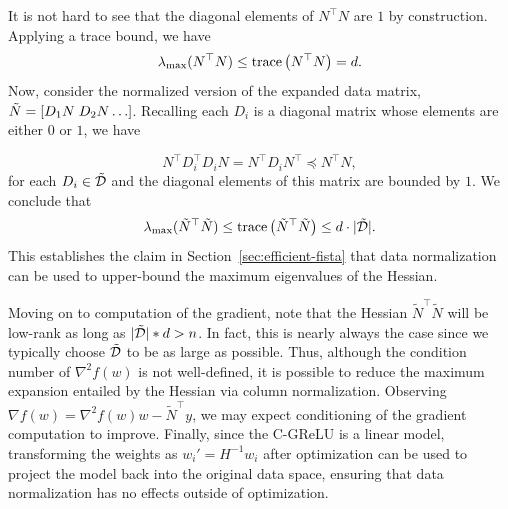 It is not hard to see that the diagonal elements of \( N^\top N \) are \( 1 \) by construction.
Applying a trace bound, we have
\begin{equation}
	\lambda_{\text{max}}(N^\top N) \leq \text{trace}\left(N^\top N\right) = d.
\end{equation}
Now, consider the normalized version of the expanded data matrix, \( \tilde N = \left[D_1 N \; D_2 N \ldots\right] \).
Recalling each \( D_i \) is a diagonal matrix whose elements are either \( 0 \) or \( 1 \), we have

\[ N^\top D_i^\top D_i N = N^\top D_i N^\top \preceq N^\top N, \]
for each \( D_i \in \tilde {\mathcal{D}} \) and the diagonal elements of this matrix are bounded by \( 1 \).
We conclude that
\[
	\lambda_{\text{max}}(\tilde N^\top \tilde N) \leq \text{trace}\left(\tilde N^\top \tilde N\right) \leq d \cdot |\tilde {\mathcal{D}}|.
\]
This establishes the claim in Section~\ref{sec:efficient-fista} that data normalization can be used to upper-bound the maximum eigenvalues of the Hessian.

Moving on to computation of the gradient, note that the Hessian \( \tilde N^\top \tilde N \) will be low-rank as long as \( |\tilde {\mathcal{D}}| * d > n \).
In fact, this is nearly always the case since we typically choose \( \tilde {\mathcal{D}} \) to be as large as possible.
Thus, although the condition number of \( \nabla^2 f(w) \) is not well-defined, it is possible to reduce the maximum expansion entailed by the Hessian via column normalization.
Observing \( \nabla f(w) = \nabla^2 f(w) w - \tilde N^\top y \), we may expect conditioning of the gradient computation to improve.
Finally, since the C-GReLU is a linear model, transforming the weights as \( w_i' = H^{-1} w_i \) after optimization can be used to project the model back into the original data space, ensuring that data normalization has no effects outside of optimization.
